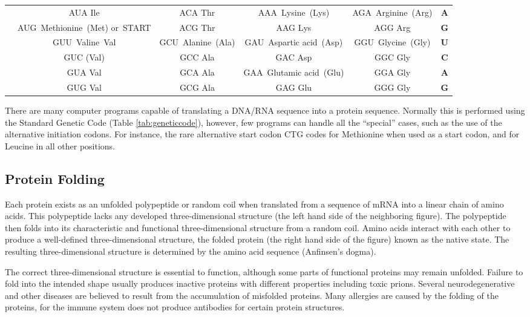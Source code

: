 \begin{longtable}[t]{>{\bfseries}ccccc>{\bfseries}c}
\rowcolor{gray!6}   & AUA Ile & ACA Thr & AAA Lysine (Lys) & AGA Arginine (Arg) & A\\

\multirow{-4}{*}{\centering\arraybackslash A} & AUG Methionine (Met) or START & ACG Thr & AAG Lys & AGG Arg & G\\
\cmidrule{1-6}
\rowcolor{gray!6}   & GUU Valine Val & GCU Alanine (Ala) & GAU Aspartic acid (Asp) & GGU Glycine (Gly) & U\\

 & GUC (Val) & GCC Ala & GAC Asp & GGC Gly & C\\

\rowcolor{gray!6}   & GUA Val & GCA Ala & GAA Glutamic acid (Glu) & GGA Gly & A\\

\multirow{-4}{*}{\centering\arraybackslash G} & GUG Val & GCG Ala & GAG Glu & GGG Gly & G\\
\bottomrule
\end{longtable}
\endgroup{}

\twocolumn

There are many computer programs capable of translating a DNA/RNA sequence into a protein sequence. Normally this is performed using the Standard Genetic Code (Table \ref{tab:geneticcode}), however, few programs can handle all the ``special'' cases, such as the use of the alternative initiation codons. For instance, the rare alternative start codon CTG codes for Methionine when used as a start codon, and for Leucine in all other positions.

\hypertarget{protein-folding}{%
\subsection{Protein Folding}\label{protein-folding}}

Each protein exists as an unfolded polypeptide or random coil when translated from a sequence of mRNA into a linear chain of amino acids. This polypeptide lacks any developed three-dimensional structure (the left hand side of the neighboring figure). The polypeptide then folds into its characteristic and functional three-dimensional structure from a random coil. Amino acids interact with each other to produce a well-defined three-dimensional structure, the folded protein (the right hand side of the figure) known as the native state. The resulting three-dimensional structure is determined by the amino acid sequence (Anfinsen's dogma).

The correct three-dimensional structure is essential to function, although some parts of functional proteins may remain unfolded. Failure to fold into the intended shape usually produces inactive proteins with different properties including toxic prions. Several neurodegenerative and other diseases are believed to result from the accumulation of misfolded proteins. Many allergies are caused by the folding of the proteins, for the immune system does not produce antibodies for certain protein structures.

